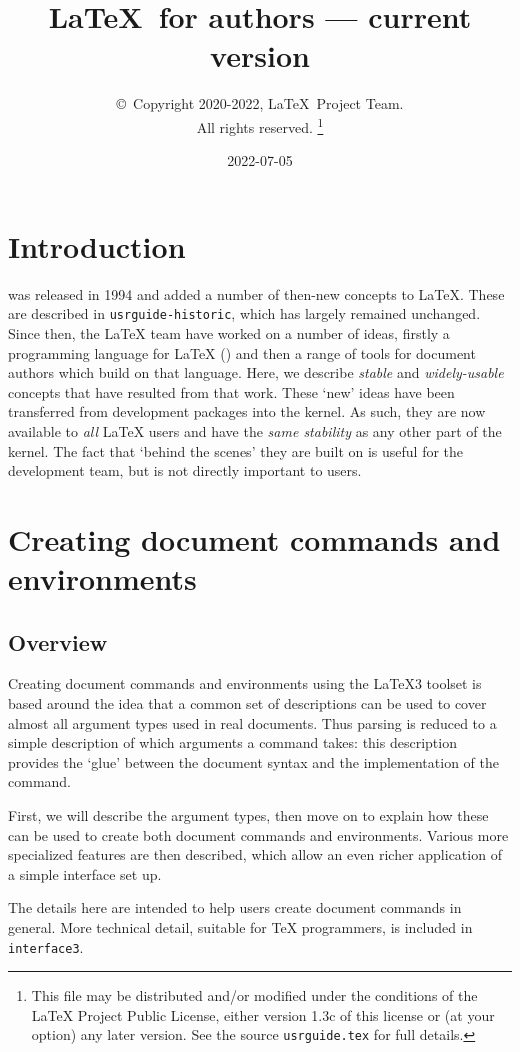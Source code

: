 \documentclass{ltxguide}
\title{\LaTeX\ for authors --- current version}
\author{\copyright~Copyright 2020-2022, \LaTeX\ Project Team.\\
   All rights reserved.%
   \footnote{This file may be distributed and/or modified under the
     conditions of the \LaTeX{} Project Public License, either version 1.3c
     of this license or (at your option) any later version. See the source
    \texttt{usrguide.tex} for full details.}%
}
\date{2022-07-05}
\begin{document}
\maketitle

\tableofcontents

\section{Introduction}

\LaTeXe{} was released in 1994 and added a number of then-new concepts to
\LaTeX{}. These are described in \texttt{usrguide-historic}, which has largely remained
unchanged. Since then, the \LaTeX{} team have worked on a number of ideas,
firstly a programming language for \LaTeX{} () and then a range of
tools for document authors which build on that language. Here, we describe
\emph{stable} and \emph{widely-usable} concepts that have resulted from that
work. These `new' ideas have been transferred from development packages
into the \LaTeXe{} kernel. As such, they are now available to \emph{all}
\LaTeX{} users and have the \emph{same stability} as any other part of the
kernel. The fact that `behind the scenes' they are built on 
is useful for the development team, but is not directly important to users.

\section{Creating document commands and environments}

\subsection{Overview}

Creating document commands and environments using the \LaTeX3 toolset is based
around the idea that a common set of descriptions can be used to cover almost
all argument types used in real documents. Thus parsing is reduced to a simple
description of which arguments a command takes: this description provides the
`glue' between the document syntax and the implementation of the
command.

First, we will describe the argument types, then move on to explain how these
can be used to create both document commands and environments. Various more
specialized features are then described, which allow an even richer application
of a simple interface set up.

The details here are intended to help users create document commands in
general. More technical detail, suitable for \TeX{} programmers, is included
in \texttt{interface3}.
\end{document}
